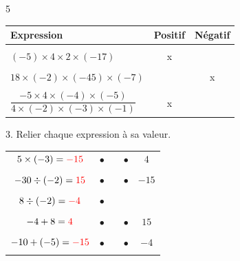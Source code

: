 \documentclass[a4paper]{book}
\begin{document}
{\begin{exerciceNote}{5}
\begin{enumerate}[leftmargin=*]
\begin{minipage}[b]{0.45\linewidth}
                \begin{tabular}{|l|c|c|}
                    \hline
                    Expression & Positif & Négatif\\[2ex] 
                    \hline & & \\
                    $(-5)\times4\times2\times(-17)$ & x & \\[2ex] 
                    \hline & &\\
                    $18\times(-2)\times(-45)\times(-7)$ & & x \\[2ex]
                    \hline & &\\
                    $\dfrac{-5\times4\times(-4)\times(-5)}{4\times(-2)\times(-3)\times(-1)}$ & x &  \\[2ex]
                    \hline
                \end{tabular}
            \end{minipage}
            \hfill \vline\hfill
            \begin{minipage}{0.45\linewidth}
                3. Relier chaque expression à sa valeur.

                \bigskip

                \begin{tabular}{ccp{0.5cm}cc}
                    $5\times(-3)=\textcolor{red}{-15}$   & $\bullet$   & & $\bullet$ & $4$ \\ \\

                    $-30\div(-2)=\textcolor{red}{15}$   & $\bullet$   & & $\bullet$ & $-15$ \\ \\

                    $8\div(-2)=\textcolor{red}{-4}$     & $\bullet$   & &  \\ \\

                    $-4+8=\textcolor{red}{4}$          & $\bullet$   & & $\bullet$ & $15$  \\ \\

                    $-10 +(-5)=\textcolor{red}{-15}$         & $\bullet$   & & $\bullet$ & $-4$ \\ \\
                \end{tabular}

                \vspace{1cm}
            \end{minipage}
        \end{enumerate}       
    \end{exerciceNote}


}
\end{document}
